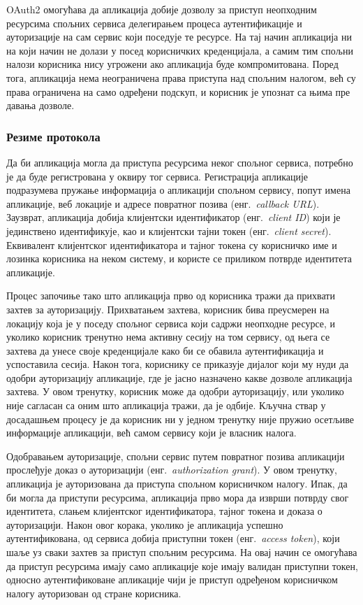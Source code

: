 \documentclass[12pt,oneside]{memoir}
\begin{document}
OAuth2 омогућава да апликација добије дозволу за приступ неопходним ресурсима спољних сервиса делегирањем процеса аутентификације и ауторизације на сам сервис који поседује те ресурсе. На тај начин апликација ни на који начин не долази у посед корисничких креденцијала, а самим тим спољни налози корисника нису угрожени ако апликација буде компромитована. Поред тога, апликација нема неограничена права приступа над спољним налогом, већ су права ограничена на само одређени подскуп, и корисник је упознат са њима пре давања дозволе.

\subsubsection{Резиме протокола}
Да би апликација могла да приступа ресурсима неког спољног сервиса, потребно је да буде регистрована у оквиру тог сервиса. Регистрација апликације подразумева пружање информација о апликацији спољном сервису, попут имена апликације, веб локације и адресе повратног позива (енг.~\textit{callback URL}). Заузврат, апликација добија клијентски идентификатор (енг.~\textit{client ID}) који је јединствено идентификује, као и клијентски тајни токен (енг.~\textit{client secret}). Еквивалент клијентског идентификатора и тајног токена су корисничко име и лозинка корисника на неком систему, и користе се приликом потврде идентитета апликације.

Процес започиње тако што апликација прво од корисника тражи да прихвати захтев за ауторизацију. Прихватањем захтева, корисник бива преусмерен на локацију која је у поседу спољног сервиса који садржи неопходне ресурсе, и уколико корисник тренутно нема активну сесију на том сервису, од њега се захтева да унесе своје креденцијале како би се обавила аутентификација и успоставила сесија. Након тога, кориснику се приказује дијалог који му нуди да одобри ауторизацију апликације, где је јасно назначено какве дозволе апликација захтева. У овом тренутку, корисник може да одобри ауторизацију, или уколико није сагласан са оним што апликација тражи, да је одбије. Кључна ствар у досадашњем процесу је да корисник ни у једном тренутку није пружио осетљиве информације апликацији, већ самом сервису који је власник налога.

Одобравањем ауторизације, спољни сервис путем повратног позива апликацији прослеђује доказ о ауторизацији (енг.~\textit{authorization grant}). У овом тренутку, апликација је ауторизована да приступа спољном корисничком налогу. Ипак, да би могла да приступи ресурсима, апликација прво мора да изврши потврду свог идентитета, слањем клијентског идентификатора, тајног токена и доказа о ауторизацији. Након овог корака, уколико је апликација успешно аутентификована, од сервиса добија приступни токен (енг.~\textit{access token}), који шаље уз сваки захтев за приступ спољним ресурсима. На овај начин се омогућава да приступ ресурсима имају само апликације које имају валидан приступни токен, односно аутентификоване апликације чији је приступ одређеном корисничком налогу ауторизован од стране корисника.
\end{document}
